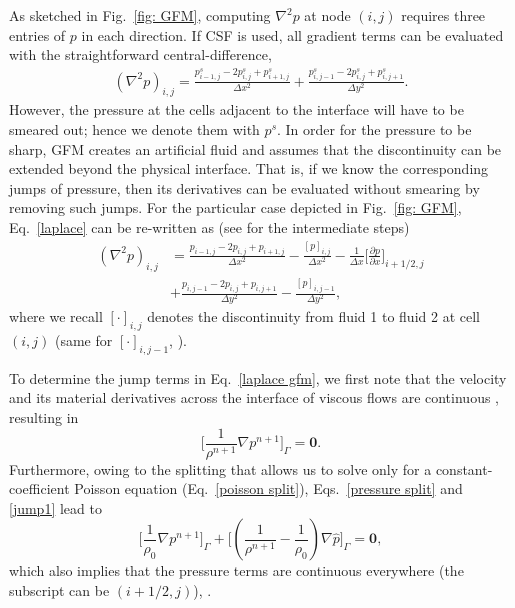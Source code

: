 As sketched in Fig.\ \ref{fig: GFM}, computing $\nabla^2 p$ at node $(i,j)$ requires three entries of $p$ in each direction. If CSF is used, all gradient terms can be evaluated with the straightforward central-difference, \ie
\begin{equation}
  \begin{aligned}
    (\nabla^2 p)_{i,j} = \frac{p_{i-1,j}^s -2p_{i,j}^s +p_{i+1,j}^s}{\Delta x^2}
                        +\frac{p_{i,j-1}^s -2p_{i,j}^s +p_{i,j+1}^s}{\Delta y^2}.
  \end{aligned}
  \label{laplace}
\end{equation}
However, the pressure at the cells adjacent to the interface will have to be smeared out; hence we denote them with $p^s$. In order for the pressure to be sharp, GFM creates an artificial fluid  and assumes that the discontinuity can be extended beyond the physical interface. That is, if we know the corresponding jumps of pressure, then its derivatives can be evaluated without smearing by removing such jumps. For the particular case depicted in Fig.\ \ref{fig: GFM}, Eq.\ \eqref{laplace} can be re-written as (see \cite{Liu_JCP_2000} for the intermediate steps)
\begin{equation}
  \begin{aligned}
    (\nabla^2 p)_{i,j} & =\frac{p_{i-1,j} -2p_{i,j} +p_{i+1,j}}{\Delta x^2} 
                         -\frac{[p]_{i,j}}{\Delta x^2} 
                         -\frac{1}{\Delta x} \bigg[\frac{\partial p}{\partial x} \bigg]_{i+1/2,j} \\
                       & +\frac{p_{i,j-1} -2p_{i,j} +p_{i,j+1}}{\Delta y^2}
                         -\frac{[p]_{i,j-1}}{\Delta y^2},
  \end{aligned}
  \label{laplace gfm}
\end{equation}
where we recall $[\cdot]_{i,j}$ denotes the discontinuity from fluid 1 to fluid 2 at cell $(i,j)$ (same for $[\cdot]_{i,j-1}$, \etc).

To determine the jump terms in Eq.\ \eqref{laplace gfm}, we first note that the velocity and its material derivatives across the interface of viscous flows are continuous \cite{Kang_JSC_2000, Desjardins_JCP_2008}, resulting in
\begin{equation}
    \bigg[\frac{1}{\rho^{n+1}} \nabla p^{n+1} \bigg]_\Gamma ={\bm 0}.
  \label{jump1}
\end{equation}
Furthermore, owing to the splitting that allows us to solve only for a constant-coefficient Poisson equation (Eq.\ \eqref{poisson split}), Eqs.\ \eqref{pressure split} and \eqref{jump1} lead to
\begin{equation}
    \bigg[ \frac{1}{\rho_0}\nabla p^{n+1} \bigg]_\Gamma + 
    \bigg[ (\frac{1}{\rho^{n+1}} -\frac{1}{\rho_0}) \nabla \hat{p} \bigg]_\Gamma = {\bm 0},
  \label{jump2}
\end{equation}
which also implies that the pressure  terms are continuous everywhere (\eg the subscript can be $(i+1/2,j)$), .

